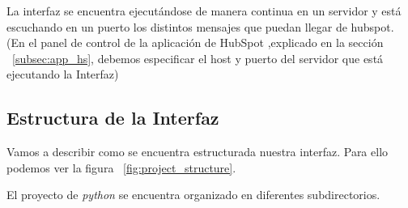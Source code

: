 La interfaz se encuentra ejecutándose de manera continua en un servidor y está escuchando en un puerto los distintos mensajes que puedan llegar de hubspot.
(En el panel de control de la aplicación de HubSpot ,explicado en la sección ~\ref{subsec:app_hs}, debemos especificar el host y puerto del servidor que está ejecutando la Interfaz)


\subsection{Estructura de la Interfaz}
Vamos a describir como se encuentra estructurada nuestra interfaz. Para ello podemos ver la figura ~\ref{fig:project_structure}. 

El proyecto de \textit{python} se encuentra organizado en diferentes subdirectorios.

